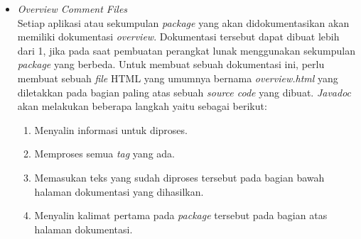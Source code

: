 \begin{itemize}
	\begin{lstlisting}[language=Java, caption={\it File package-info.java}, label={package-info}]
	/**
	 * Provides the classes necessary to create an applet
	 * and the classes an applet uses to communicate
	 * with its applet context.
	 *
	 * @since 1.0
	 * @see java.awt
	 */
	 package java.lang.applet;
	\end{lstlisting}
	Ketika {\it Javadoc} memproses {\it package} tersebut, {\it Javadoc} akan melakukan beberapa langkah yaitu sebagai berikut:
	\begin{enumerate}
		\item Menyalin informasi untuk diproses. Jika {\it file} berupa HTML maka pada bagian {\it <body>} hingga {\it </body>} akan disalin.
		\item Memproses semua {\it tag} yang ada.
		\item Memasukkan teks yang sudah diproses tersebut pada bagian bawah halaman dokumentasi yang dihasilkan.
		\item Menyalin kalimat pertama pada {\it package} tersebut pada bagian atas halaman dokumentasi.
	\end{enumerate}
	\begin{figure}[H]
	  \centering  
	  \texttt{[image: b]}
	  \caption[Hasil dokumentasi pada dari {\it package}]{Hasil dokumentasi pada dari {\it package}}
	  \label{fig:b} 
    \end{figure}
    Pada gambar \ref{fig:b} adalah hasil {\it Javadoc} mendokumentasikan setiap {\it package}
	\item {\it Overview Comment Files}\\
	Setiap aplikasi atau sekumpulan {\it package} yang akan didokumentasikan akan memiliki dokumentasi {\it overview}. Dokumentasi tersebut dapat dibuat lebih dari 1, jika pada saat pembuatan perangkat lunak menggunakan sekumpulan {\it package} yang berbeda.
	Untuk membuat sebuah dokumentasi ini, perlu membuat sebuah {\it file} HTML yang umumnya bernama {\it overview.html} yang diletakkan pada bagian paling atas sebuah {\it source code} yang dibuat. {\it Javadoc} akan melakukan beberapa langkah yaitu sebagai berikut:
	\begin{enumerate}
		\item Menyalin informasi untuk diproses.
		\item Memproses semua {\it tag} yang ada.
		\item Memasukan teks yang sudah diproses tersebut pada bagian bawah halaman dokumentasi yang dihasilkan.
		\item Menyalin kalimat pertama pada {\it package} tersebut pada bagian atas halaman dokumentasi.

\end{enumerate}
\end{itemize}
